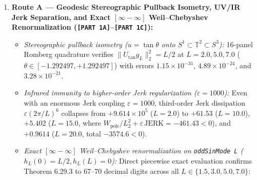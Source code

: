 \documentclass[
  11pt,
]{article}
\providecommand{\tightlist}{%
  \setlength{\itemsep}{0pt}\setlength{\parskip}{0pt}}
\begin{document}
\begin{enumerate}
\def\labelenumi{\arabic{enumi}.}
\item
  \textbf{Route A --- Geodesic Stereographic Pullback Isometry, UV/IR
  Jerk Separation, and Exact \([\infty - \infty]\) Weil--Chebyshev
  Renormalization (\texttt{{[}PART\ 1A{]}}--\texttt{{[}PART\ 1C{]}}):}

  \begin{itemize}
  \tightlist
  \item
    \emph{Stereographic pullback isometry (\(u = \tan\theta\) onto
    \(S^1 \subset \mathbb{T}^2 \subset S^3\)):} 16-panel Romberg
    quadrature verifies \(\|U_{\tan} g_L\|_2^2 = L/2\) at
    \(L = 2.0, 5.0, 7.0\) (\(\theta \in [-1.292497, +1.292497]\)) with
    errors \(1.15 \times 10^{-31}\), \(4.89 \times 10^{-24}\), and
    \(3.28 \times 10^{-21}\).
  \item
    \emph{Infrared immunity to higher-order Jerk regularization
    (\(\varepsilon = 1000\)):} Even with an enormous Jerk coupling
    \(\varepsilon = 1000\), third-order Jerk dissipation
    \(\varepsilon(2\pi/L)^6\) collapses from \(+9.614 \times 10^5\)
    (\(L = 2.0\)) to \(+61.53\) (\(L = 10.0\)), \(+5.402\)
    (\(L = 15.0\), where
    \(W_{\text{pole}}/L_2^2 + \varepsilon\,\text{JERK} = -461.43 < 0\)),
    and \(+0.9614\) (\(L = 20.0\), total \(-3574.6 < 0\)).
  \item
    \emph{Exact \([\infty - \infty]\) Weil--Chebyshev renormalization on
    \texttt{oddSinMode\ L} (\(h_L(0) = L/2, h_L(L) = 0\)):} Direct
    piecewise exact evaluation confirms Theorem 6.29.3 to 67--70 decimal
    digits across all \(L \in \{1.5, 3.0, 5.0, 7.0\}\):
  \end{itemize}


\end{enumerate}
\end{document}
